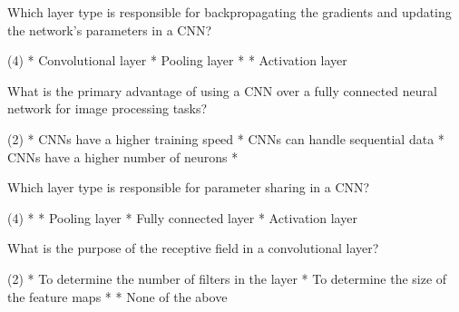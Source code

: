 \documentclass[10pt]{extarticle}
\begin{document}
\begin{exercise}
    Which layer type is responsible for backpropagating the gradients and updating the network's parameters in a CNN?
    \begin{choice} (4)
        * Convolutional layer
        * Pooling layer
        * 
        * Activation layer
    \end{choice}
\end{exercise}
\begin{solution}
\end{solution}

\begin{exercise}
    What is the primary advantage of using a CNN over a fully connected neural network for image processing tasks?
    \begin{choice} (2)
        * CNNs have a higher training speed
        * CNNs can handle sequential data
        * CNNs have a higher number of neurons
        * 
    \end{choice}
\end{exercise}
\begin{solution}
\end{solution}

\begin{exercise}
    Which layer type is responsible for parameter sharing in a CNN?
    \begin{choice} (4)
        * 
        * Pooling layer
        * Fully connected layer
        * Activation layer
    \end{choice}
\end{exercise}
\begin{solution}
\end{solution}

\begin{exercise}
    What is the purpose of the receptive field in a convolutional layer?
    \begin{choice} (2)
        * To determine the number of filters in the layer
        * To determine the size of the feature maps
        * 
        * None of the above
    \end{choice}
\end{exercise}
\begin{solution}
\end{solution}
\end{document}

